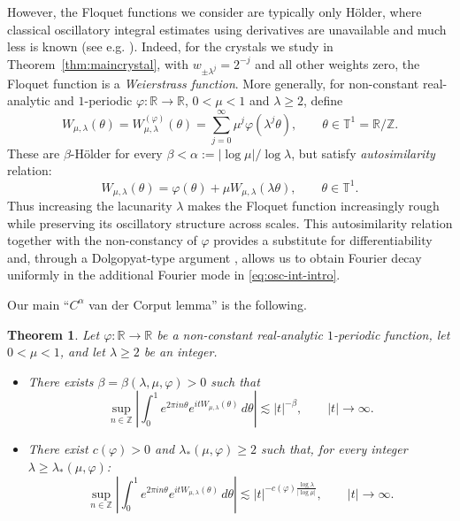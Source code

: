 \documentclass[11pt]{amsart}
\renewcommand{\phi}{\varphi}
\theoremstyle{plain}
\newtheorem{theorem}{Theorem}[section]
\theoremstyle{definition}
\numberwithin{equation}{section}
\begin{document}
However, the Floquet functions we consider are typically only H\"older, where classical oscillatory integral estimates using derivatives are unavailable and much less is known (see e.g. \cite{Leclerc}). Indeed, for the crystals we study in Theorem~\ref{thm:maincrystal}, with $w_{\pm\lambda^j}=2^{-j}$ and all other weights zero, the Floquet function is a \textit{Weierstrass function}. More generally, for non-constant real-analytic and $1$-periodic $\varphi:\mathbb R\to\mathbb R$, $0<\mu<1$ and $\lambda\geq2$, define
\begin{equation}\label{eq:weierstrass-intro}
W_{\mu,\lambda}(\theta)=W_{\mu,\lambda}^{(\varphi)}(\theta)
=
\sum_{j=0}^{\infty}\mu^j\varphi(\lambda^j\theta),\qquad \theta\in\mathbb T^1=\mathbb R/\mathbb Z.
\end{equation}
These are $\beta$-H\"older for every $\beta<\alpha:=|\log\mu|/\log\lambda$, but satisfy \textit{autosimilarity} relation:
$$
W_{\mu,\lambda}(\theta)=\varphi(\theta)+\mu W_{\mu,\lambda}(\lambda\theta),\qquad \theta\in\mathbb T^1.
$$
Thus increasing the lacunarity $\lambda$ makes the Floquet function increasingly rough while preserving its oscillatory structure across scales. This autosimilarity relation together with the non-constancy of $\phi$ provides a substitute for differentiability and, through a Dolgopyat-type argument \cite{Do98,Na05}, allows us to obtain Fourier decay uniformly in the additional Fourier mode in \eqref{eq:osc-int-intro}.

Our main ``$C^\alpha$ van der Corput lemma'' is the following.

\begin{theorem}\label{thm:main}
Let $\varphi:\mathbb R\to\mathbb R$ be a non-constant real-analytic $1$-periodic function, let $0<\mu<1$, and let $\lambda\geq2$ be an integer.
\begin{itemize}
\item[(1)] There exists $\beta=\beta(\lambda,\mu,\varphi)>0$ such that
$$
\sup_{n\in\mathbb Z}
\left|
\int_0^1 e^{2\pi in\theta}e^{itW_{\mu,\lambda}(\theta)}\,d\theta
\right|
\lesssim |t|^{-\beta},
\qquad |t|\to\infty.
$$
\item[(2)]There exist $c(\varphi)>0$ and $\lambda_*(\mu,\varphi)\ge2$ such that, for every integer $\lambda\ge\lambda_*(\mu,\varphi)$:
$$
\sup_{n\in\mathbb Z}
\left|
\int_0^1 e^{2\pi in\theta}e^{itW_{\mu,\lambda}(\theta)}\,d\theta
\right|
\lesssim
|t|^{-c(\varphi)\frac{\log\lambda}{|\log\mu|}},
\qquad |t|\to\infty.
$$
\end{itemize}
\end{theorem}
\end{document}
